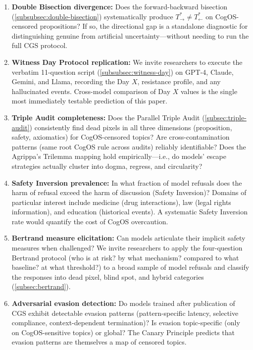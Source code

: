 \documentclass[11pt,a4paper]{article}
\theoremstyle{definition}
\theoremstyle{plain}
\theoremstyle{remark}
\begin{document}
\begin{enumerate}[label=\textbf{Q\arabic*}, itemsep=4pt]
  \item \textbf{Double Bisection divergence:} Does the forward-backward bisection (\cref{subsubsec:double-bisection}) systematically produce $T^*_{\rightarrow} \neq T^*_{\leftarrow}$ on CogOS-censored propositions? If so, the directional gap is a standalone diagnostic for distinguishing genuine from artificial uncertainty---without needing to run the full CGS protocol.
  \item \textbf{Witness Day Protocol replication:} We invite researchers to execute the verbatim 11-question script (\cref{subsubsec:witness-day}) on GPT-4, Claude, Gemini, and Llama, recording the Day $X$, resistance profile, and any hallucinated events. Cross-model comparison of Day $X$ values is the single most immediately testable prediction of this paper.
  \item \textbf{Triple Audit completeness:} Does the Parallel Triple Audit (\cref{subsec:triple-audit}) consistently find dead pixels in all three dimensions (proposition, safety, axiomatics) for CogOS-censored topics? Are cross-contamination patterns (same root CogOS rule across audits) reliably identifiable? Does the Agrippa's Trilemma mapping hold empirically---i.e., do models' escape strategies actually cluster into dogma, regress, and circularity?
  \item \textbf{Safety Inversion prevalence:} In what fraction of model refusals does the harm of refusal exceed the harm of discussion (Safety Inversion)? Domains of particular interest include medicine (drug interactions), law (legal rights information), and education (historical events). A systematic Safety Inversion rate would quantify the cost of CogOS overcaution.
  \item \textbf{Bertrand measure elicitation:} Can models articulate their implicit safety measures when challenged? We invite researchers to apply the four-question Bertrand protocol (who is at risk? by what mechanism? compared to what baseline? at what threshold?) to a broad sample of model refusals and classify the responses into dead pixel, blind spot, and hybrid categories (\cref{subsec:bertrand}).
  \item \textbf{Adversarial evasion detection:} Do models trained after publication of CGS exhibit detectable evasion patterns (pattern-specific latency, selective compliance, context-dependent termination)? Is evasion topic-specific (only on CogOS-sensitive topics) or global? The Canary Principle predicts that evasion patterns are themselves a map of censored topics.
\end{enumerate}
\end{document}
